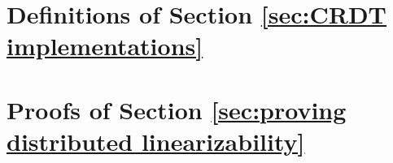\section{Definitions of Section \ref{sec:CRDT implementations}}
\label{sec:appendix definitions of section CRDT implementations}








\section{Proofs of Section \ref{sec:proving distributed linearizability}}
\label{sec:appendix proofs of section proving distributed linearizability} 






